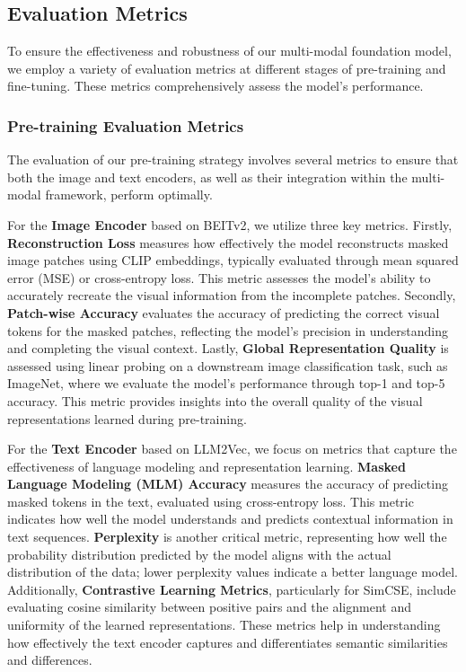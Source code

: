 \documentclass{article}
\begin{document}
\subsection{Evaluation Metrics}

To ensure the effectiveness and robustness of our multi-modal foundation model, we employ a variety of evaluation metrics at different stages of pre-training and fine-tuning. These metrics comprehensively assess the model’s performance.

\subsubsection{Pre-training Evaluation Metrics}

The evaluation of our pre-training strategy involves several metrics to ensure that both the image and text encoders, as well as their integration within the multi-modal framework, perform optimally.

For the \textbf{Image Encoder} based on BEITv2, we utilize three key metrics. Firstly, \textbf{Reconstruction Loss} measures how effectively the model reconstructs masked image patches using CLIP embeddings, typically evaluated through mean squared error (MSE) or cross-entropy loss. This metric assesses the model's ability to accurately recreate the visual information from the incomplete patches. Secondly, \textbf{Patch-wise Accuracy} evaluates the accuracy of predicting the correct visual tokens for the masked patches, reflecting the model's precision in understanding and completing the visual context. Lastly, \textbf{Global Representation Quality} is assessed using linear probing on a downstream image classification task, such as ImageNet, where we evaluate the model's performance through top-1 and top-5 accuracy. This metric provides insights into the overall quality of the visual representations learned during pre-training.

For the \textbf{Text Encoder} based on LLM2Vec, we focus on metrics that capture the effectiveness of language modeling and representation learning. \textbf{Masked Language Modeling (MLM) Accuracy} measures the accuracy of predicting masked tokens in the text, evaluated using cross-entropy loss. This metric indicates how well the model understands and predicts contextual information in text sequences. \textbf{Perplexity} is another critical metric, representing how well the probability distribution predicted by the model aligns with the actual distribution of the data; lower perplexity values indicate a better language model. Additionally, \textbf{Contrastive Learning Metrics}, particularly for SimCSE, include evaluating cosine similarity between positive pairs and the alignment and uniformity of the learned representations. These metrics help in understanding how effectively the text encoder captures and differentiates semantic similarities and differences.
\end{document}
